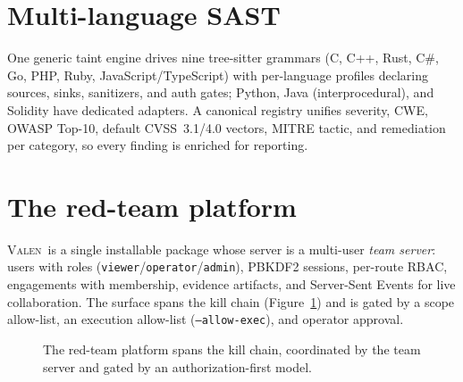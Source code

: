 \documentclass[journal]{IEEEtran}
\newcommand{\valen}{\textsc{Valen}}
\begin{document}
\section{Multi-language SAST}
\label{sec:langs}
One generic taint engine drives nine tree-sitter grammars (C, C++, Rust, C\#,
Go, PHP, Ruby, JavaScript/TypeScript) with per-language profiles declaring
sources, sinks, sanitizers, and auth gates; Python, Java (interprocedural), and
Solidity have dedicated adapters. A canonical registry unifies severity, CWE,
OWASP Top-10, default CVSS~3.1/4.0 vectors, MITRE tactic, and remediation per
category, so every finding is enriched for reporting.

\section{The red-team platform}
\label{sec:platform}
\valen\ is a single installable package whose server is a multi-user \emph{team
server}: users with roles (\texttt{viewer}/\texttt{operator}/\texttt{admin}),
PBKDF2 sessions, per-route RBAC, engagements with membership, evidence artifacts,
and Server-Sent Events for live collaboration. The surface spans the kill chain
(Figure~\ref{fig:killchain}) and is gated by a scope allow-list, an execution
allow-list (\texttt{--allow-exec}), and operator approval.

\begin{figure}[!t]
\centering
{}
\caption{The red-team platform spans the kill chain, coordinated by the team
server and gated by an authorization-first model.}
\label{fig:killchain}
\end{figure}
\end{document}
